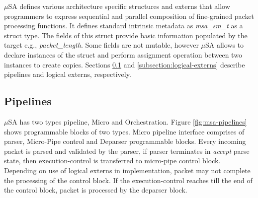 \documentclass{hotnets19}
\begin{document}
$\mu$SA defines various architecture specific structures and externs that allow programmers to express sequential and parallel composition of fine-grained packet processing functions.
It defines standard intrinsic metadata as \emph{msa\_sm\_t} as a struct type.
The fields of this struct provide basic information populated by the target e.g., \emph{packet\_length}.
Some fields are not mutable, however $\mu$SA allows to declare instances of the struct and perform assignment operation between two instances to create copies.
Sections \ref{subsection:pipelines} and \ref{subsection:logical-externs} describe pipelines and logical externs, respectively.



\subsection{Pipelines}
\label{subsection:pipelines}
$\mu$SA has two types pipeline, Micro and Orchestration.
Figure \ref{fig:msa-pipelines} shows programmable blocks of two types.
Micro pipeline interface comprises of parser, Micro-Pipe control and Deparser programmable blocks.
Every incoming packet is parsed and validated by the parser, if parser terminates in \emph{accept} parse state, then execution-control is transferred to micro-pipe control block.
Depending on use of logical externs in implementation, packet may not complete the processing of the control block.
If the execution-control reaches till the end of the control block, packet is processed by the deparser block.
\end{document}
